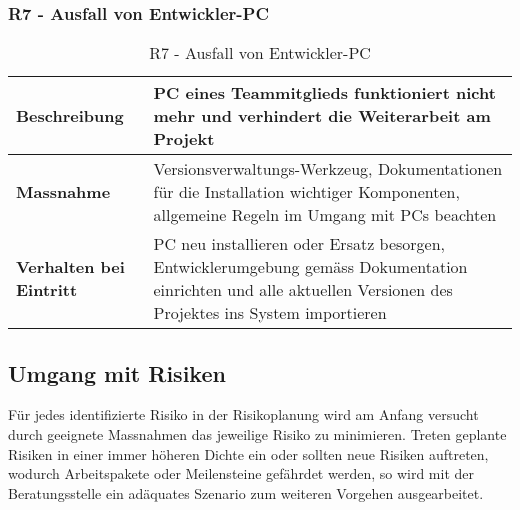 \subsubsection{R7 - Ausfall von Entwickler-PC}
\begin{table}[H]
    \centering
    \def\arraystretch{2}
    \begin{tabular}{| p{4.5cm} | p{11.5cm} |} \hline
        \textbf{Beschreibung} & PC eines Teammitglieds funktioniert nicht mehr und verhindert die Weiterarbeit am Projekt \\ \hline
        \textbf{Massnahme} & Versionsverwaltungs-Werkzeug, Dokumentationen für die Installation wichtiger Komponenten, allgemeine Regeln im Umgang mit PCs beachten\\ \hline
        \textbf{Verhalten bei Eintritt} & PC neu installieren oder Ersatz besorgen, Entwicklerumgebung gemäss Dokumentation einrichten und alle aktuellen Versionen des Projektes ins System importieren \\ \hline 
    \end{tabular}
    \caption{R7 - Ausfall von Entwickler-PC}
\end{table}

\subsection{Umgang mit Risiken}
Für jedes identifizierte Risiko in der Risikoplanung wird am Anfang versucht durch geeignete Massnahmen das jeweilige Risiko zu minimieren. Treten geplante Risiken in einer immer höheren Dichte ein oder sollten neue Risiken auftreten, wodurch Arbeitspakete oder Meilensteine gefährdet werden, so wird mit der Beratungsstelle ein adäquates Szenario zum weiteren Vorgehen ausgearbeitet.

